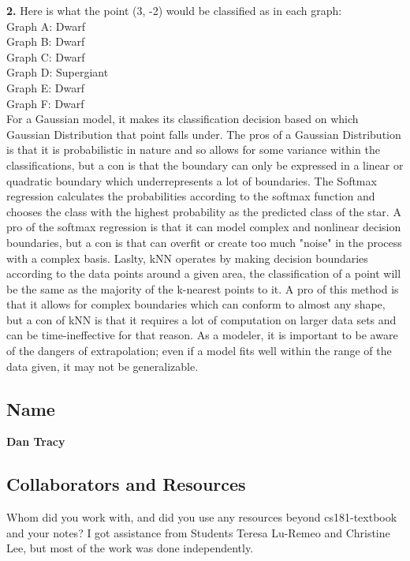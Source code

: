 \documentclass[submit]{harvardml}
\begin{document}
  \textbf{2.} Here is what the point (3, -2) would be classified as in each graph: \\
  Graph A: Dwarf \\
  Graph B: Dwarf \\
  Graph C: Dwarf \\
  Graph D: Supergiant \\
  Graph E: Dwarf \\
  Graph F: Dwarf \\

  For a Gaussian model, it makes its classification decision based on which Gaussian Distribution that point falls under. The pros of a Gaussian Distribution is that it is probabilistic in nature 
  and so allows for some variance within the classifications, but a con is that the boundary can only be expressed in a linear or quadratic boundary which underrepresents a lot of boundaries.
  The Softmax regression calculates the probabilities according to the softmax function and chooses the class with the highest probability as the predicted class of the star. A pro of the softmax regression is that 
  it can model complex and nonlinear decision boundaries, but a con is that can overfit or create too much "noise" in the process with a complex basis. Laslty, kNN operates 
  by making decision boundaries according to the data points around a given area, the classification of a point will be the same as the majority of the k-nearest points to it. A pro of this method is that 
  it allows for complex boundaries which can conform to almost any shape, but a con of kNN is that it requires a lot of computation on larger data sets and can be time-ineffective for that reason. As a modeler, 
  it is important to be aware of the dangers of extrapolation; even if a model fits well within the range of the data given, it may not be generalizable. 

\subsection*{Name}
\textbf{Dan Tracy}
\subsection*{Collaborators and Resources}
Whom did you work with, and did you use any resources beyond cs181-textbook and your notes?
I got assistance from Students Teresa Lu-Remeo and Christine Lee, but most of the work was done independently.
\end{document}
